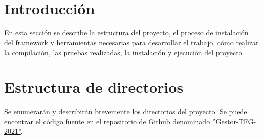 
\section{Introducción}
En esta sección se describe la estructura del proyecto, el proceso de instalación del framework y herramientas necesarias para desarrollar el trabajo, cómo realizar la compilación, las pruebas realizadas, la instalación y ejecución del proyecto.

\section{Estructura de directorios}
Se enumerarán y describirán brevemente los directorios del proyecto. Se puede encontrar el código fuente en el repositorio de Github denominado \href{https://github.com/dbo1001/Gestor-TFG-2021}{''Gestor-TFG-2021''}.

